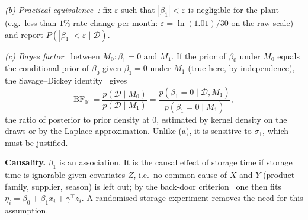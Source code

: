 \documentclass[10pt,twocolumn]{article}
\newcommand{\D}{\mathcal D}
\begin{document}
\emph{(b) Practical equivalence~\cite{kruschke2018}:} fix $\varepsilon$ such that $|\beta_1|<\varepsilon$ is negligible for the plant (e.g.\ less than $1\%$ rate change per month: $\varepsilon=\ln(1.01)/30$ on the raw scale) and report $P(|\beta_1|<\varepsilon\mid\D)$.

\emph{(c) Bayes factor~\cite{kass1995}} between $M_0:\beta_1=0$ and $M_1$. If the prior of $\beta_0$ under $M_0$ equals the conditional prior of $\beta_0$ given $\beta_1=0$ under $M_1$ (true here, by independence), the Savage--Dickey identity~\cite{dickey1971} gives
\begin{equation}
\mathrm{BF}_{01}=\frac{p(\D\mid M_0)}{p(\D\mid M_1)}=\frac{p(\beta_1=0\mid\D,M_1)}{p(\beta_1=0\mid M_1)},
\end{equation}
the ratio of posterior to prior density at $0$, estimated by kernel density on the draws or by the Laplace approximation. Unlike (a), it is sensitive to $\sigma_1$, which must be justified.

\textbf{Causality.} $\beta_1$ is an association. It is the causal effect of storage time if storage time is ignorable given covariates $Z$, i.e.\ no common cause of $X$ and $Y$ (product family, supplier, season) is left out; by the back-door criterion~\cite{pearl2009} one then fits $\eta_i=\beta_0+\beta_1x_i+\gamma^\top z_i$. A randomised storage experiment removes the need for this assumption.
\end{document}
